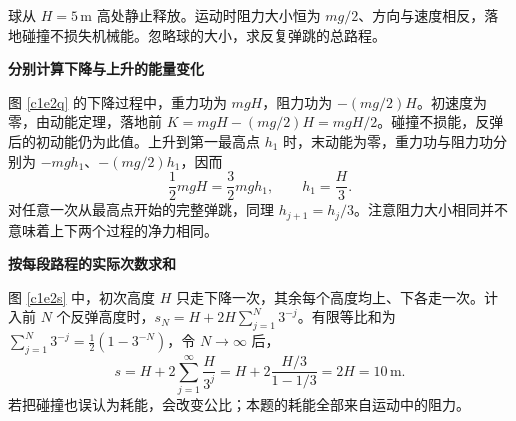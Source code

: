 \begin{question}
\begin{example}[反复弹跳的总路程]
球从 $H=5\,\mathrm m$ 高处静止释放。运动时阻力大小恒为 $mg/2$、方向与速度相反，落地碰撞不损失机械能。忽略球的大小，求反复弹跳的总路程。
\end{example}
\end{question}
\begin{solution}\textbf{分别计算下降与上升的能量变化}\par\nobreak
图 \ref{c1e2q} 的下降过程中，重力功为 $mgH$，阻力功为 $-(mg/2)H$。初速度为零，由动能定理，落地前 $K=mgH-(mg/2)H=mgH/2$。碰撞不损能，反弹后的初动能仍为此值。上升到第一最高点 $h_1$ 时，末动能为零，重力功与阻力功分别为 $-mgh_1$、$-(mg/2)h_1$，因而
\[
 \frac12mgH=\frac32mgh_1,\qquad h_1=\frac H3.
\]
对任意一次从最高点开始的完整弹跳，同理 $h_{j+1}=h_j/3$。注意阻力大小相同并不意味着上下两个过程的净力相同。




\par\medskip{}\noindent\textbf{按每段路程的实际次数求和}\par\nobreak
图 \ref{c1e2s} 中，初次高度 $H$ 只走下降一次，其余每个高度均上、下各走一次。计入前 $N$ 个反弹高度时，$s_N=H+2H\sum_{j=1}^{N}3^{-j}$。有限等比和为 $\sum_{j=1}^{N}3^{-j}=\tfrac12(1-3^{-N})$，令 $N\to\infty$ 后，
\[
 s=H+2\sum_{j=1}^\infty\frac H{3^j}
 =H+2\frac{H/3}{1-1/3}=2H=\boxed{10\,\mathrm m}.
\]
若把碰撞也误认为耗能，会改变公比；本题的耗能全部来自运动中的阻力。




\end{solution}
